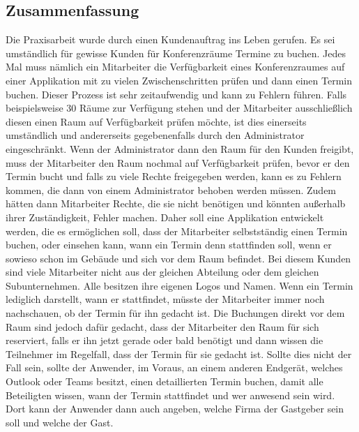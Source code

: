 
\subsection{Zusammenfassung}
Die Praxisarbeit wurde durch einen Kundenauftrag ins Leben gerufen.
Es sei umständlich für gewisse Kunden für Konferenzräume Termine zu buchen.
Jedes Mal muss nämlich ein Mitarbeiter die Verfügbarkeit eines Konferenzraumes auf einer Applikation mit zu vielen Zwischenschritten prüfen und dann einen Termin buchen.
Dieser Prozess ist sehr zeitaufwendig und kann zu Fehlern führen.
Falls beispielsweise 30 Räume zur Verfügung stehen und der Mitarbeiter ausschließlich diesen einen Raum auf Verfügbarkeit prüfen möchte, ist dies einerseits umständlich und andererseits gegebenenfalls durch den Administrator eingeschränkt.
Wenn der Administrator dann den Raum für den Kunden freigibt, muss der Mitarbeiter den Raum nochmal auf Verfügbarkeit prüfen, bevor er den Termin bucht und falls zu viele Rechte freigegeben werden, kann es zu Fehlern kommen,
die dann von einem Administrator behoben werden müssen.
Zudem hätten dann Mitarbeiter Rechte, die sie nicht benötigen und könnten außerhalb ihrer Zuständigkeit, Fehler machen.
\newline
Daher soll eine Applikation entwickelt werden, die es ermöglichen soll, dass der Mitarbeiter selbstständig einen Termin buchen, oder einsehen kann, wann ein Termin denn stattfinden soll, wenn er sowieso schon im Gebäude und sich vor dem Raum befindet.
\newline
Bei diesem Kunden sind viele Mitarbeiter nicht aus der gleichen Abteilung oder dem gleichen Subunternehmen.
Alle besitzen ihre eigenen Logos und Namen.
Wenn ein Termin lediglich darstellt, wann er stattfindet, müsste der Mitarbeiter immer noch nachschauen, ob der Termin für ihn gedacht ist.
Die Buchungen direkt vor dem Raum sind jedoch dafür gedacht, dass der Mitarbeiter den Raum für sich reserviert, falls er ihn jetzt gerade oder bald benötigt und dann wissen die Teilnehmer im Regelfall, dass der Termin für sie gedacht ist.
\newline
Sollte dies nicht der Fall sein, sollte der Anwender, im Voraus, an einem anderen Endgerät, welches Outlook oder Teams besitzt, einen detaillierten Termin buchen, damit alle Beteiligten wissen, wann der Termin stattfindet und wer anwesend sein wird.
Dort kann der Anwender dann auch angeben, welche Firma der Gastgeber sein soll und welche der Gast.
